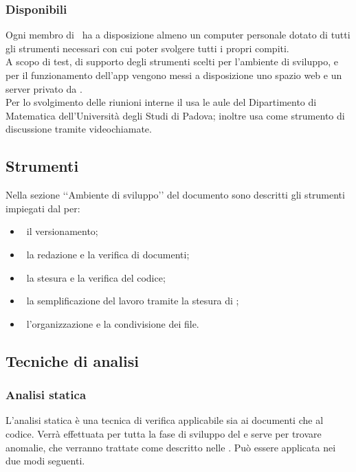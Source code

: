 		\subsubsection{Disponibili}
			Ogni membro di \AUTORE\ ha a disposizione almeno un computer personale dotato di tutti gli strumenti necessari con cui poter svolgere tutti i propri compiti. \\
			A scopo di test, di supporto degli strumenti scelti per l'ambiente di sviluppo, e per il funzionamento dell'app vengono messi a disposizione uno spazio web e un server privato da \PROPONENTE. \\
			Per lo svolgimento delle riunioni interne il  usa le aule del Dipartimento di Matematica dell'Università degli Studi di Padova; inoltre usa  come strumento di discussione tramite videochiamate.
	\subsection{Strumenti}
		Nella sezione ‘‘Ambiente di sviluppo’’ del documento \NPdoc sono descritti gli strumenti  impiegati dal  per:
		\begin{itemize}
			\item\ il versionamento;
			\item\ la redazione e la verifica di documenti;
			\item\ la stesura e la verifica del codice;
			\item\ la semplificazione del lavoro tramite la stesura di ; %
			\item\ l'organizzazione e la condivisione dei file.
		\end{itemize}
	\subsection{Tecniche di analisi}
		\label{sec:3.8}
		\subsubsection{Analisi statica}
			L'analisi statica è una tecnica di verifica applicabile sia ai documenti che al codice. Verrà effettuata per tutta la fase di sviluppo del  e serve per trovare anomalie, che verranno trattate come descritto nelle \NPdoc. Può essere applicata nei due modi seguenti.
